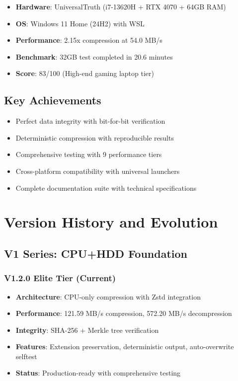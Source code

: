 \documentclass[12pt,a4paper]{article}
\begin{document}
\begin{itemize}
    \item \textbf{Hardware}: UniversalTruth (i7-13620H + RTX 4070 + 64GB RAM)
    \item \textbf{OS}: Windows 11 Home (24H2) with WSL
    \item \textbf{Performance}: 2.15x compression at 54.0 MB/s
    \item \textbf{Benchmark}: 32GB test completed in 20.6 minutes
    \item \textbf{Score}: 83/100 (High-end gaming laptop tier)
\end{itemize}

\subsection{Key Achievements}
\begin{itemize}
    \item Perfect data integrity with bit-for-bit verification
    \item Deterministic compression with reproducible results
    \item Comprehensive testing with 9 performance tiers
    \item Cross-platform compatibility with universal launchers
    \item Complete documentation suite with technical specifications
\end{itemize}

\newpage

\section{Version History and Evolution}

\subsection{V1 Series: CPU+HDD Foundation}
\subsubsection{V1.2.0 Elite Tier (Current)}
\begin{itemize}
    \item \textbf{Architecture}: CPU-only compression with Zstd integration
    \item \textbf{Performance}: 121.59 MB/s compression, 572.20 MB/s decompression
    \item \textbf{Integrity}: SHA-256 + Merkle tree verification
    \item \textbf{Features}: Extension preservation, deterministic output, auto-overwrite selftest
    \item \textbf{Status}: Production-ready with comprehensive testing
\end{itemize}
\end{document}
